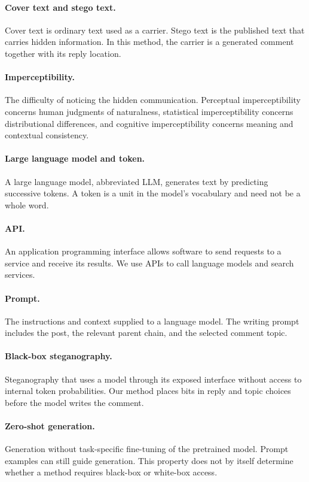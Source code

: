 \paragraph{Cover text and stego text.}
Cover text is ordinary text used as a carrier. Stego text is the published text that carries hidden information. In this method, the carrier is a generated comment together with its reply location.

\paragraph{Imperceptibility.}
The difficulty of noticing the hidden communication. Perceptual imperceptibility concerns human judgments of naturalness, statistical imperceptibility concerns distributional differences, and cognitive imperceptibility concerns meaning and contextual consistency.

\paragraph{Large language model and token.}
A large language model, abbreviated LLM, generates text by predicting successive tokens. A token is a unit in the model's vocabulary and need not be a whole word.

\paragraph{API.}
An application programming interface allows software to send requests to a service and receive its results. We use APIs to call language models and search services.

\paragraph{Prompt.}
The instructions and context supplied to a language model. The writing prompt includes the post, the relevant parent chain, and the selected comment topic.

\paragraph{Black-box steganography.}
Steganography that uses a model through its exposed interface without access to internal token probabilities. Our method places bits in reply and topic choices before the model writes the comment.

\paragraph{Zero-shot generation.}
Generation without task-specific fine-tuning of the pretrained model. Prompt examples can still guide generation. This property does not by itself determine whether a method requires black-box or white-box access.

